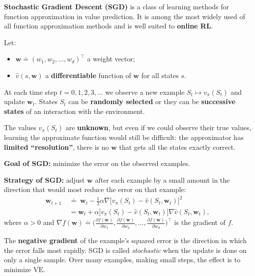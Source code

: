 \documentclass[11pt,a4paper]{article}
\theoremstyle{definition}
\theoremstyle{plain}
\theoremstyle{remark}
\begin{document}
\textbf{Stochastic Gradient Descent (SGD)} is a class of learning methods for function approximation in value prediction. It is among the most widely used of all function approximation methods and is well suited to \textbf{online RL}.

Let:
\begin{itemize}
    \item $\mathbf{w} \doteq (w_1, w_2, \ldots, w_d)^\top$ a weight vector;
    \item $\hat{v}(s, \mathbf{w})$ a \textbf{differentiable} function of $\mathbf{w}$ for all states $s$.
\end{itemize}
At each time step $t = 0, 1, 2, 3, \ldots$ we observe a new example $S_t \mapsto v_\pi(S_t)$ and update $\mathbf{w}_t$. States $S_t$ can be \textbf{randomly selected} or they can be \textbf{successive states} of an interaction with the environment.

The values $v_\pi(S_t)$ are \textbf{unknown}, but even if we could observe their true values, learning the approximate function would still be difficult: the approximator has \textbf{limited ``resolution''}, there is no $\mathbf{w}$ that gets all the states exactly correct.

\begin{tcolorbox}[colback=green!5!white, colframe=green!60!black, title={Goal and Strategy of SGD}]
\textbf{Goal of SGD:} minimize the error on the observed examples.

\textbf{Strategy of SGD:} adjust $\mathbf{w}$ after each example by a small amount in the direction that would most reduce the error on that example:
\begin{align*}
    \mathbf{w}_{t+1} \;&\doteq\; \mathbf{w}_t - \tfrac{1}{2}\alpha \nabla\!\bigl[v_\pi(S_t) - \hat{v}(S_t, \mathbf{w}_t)\bigr]^2 \\
                       &= \mathbf{w}_t + \alpha \bigl[v_\pi(S_t) - \hat{v}(S_t, \mathbf{w}_t)\bigr] \nabla \hat{v}(S_t, \mathbf{w}_t),
\end{align*}
where $\alpha > 0$ and $\nabla f(\mathbf{w}) \doteq \bigl(\tfrac{\partial f(\mathbf{w})}{\partial w_1}, \tfrac{\partial f(\mathbf{w})}{\partial w_2}, \ldots, \tfrac{\partial f(\mathbf{w})}{\partial w_d}\bigr)^\top$ is the gradient of $f$.
\end{tcolorbox}

The \textbf{negative gradient} of the example's squared error is the direction in which the error falls most rapidly. SGD is called \emph{stochastic} when the update is done on only a single sample. Over many examples, making small steps, the effect is to minimize $\overline{\mathrm{VE}}$.
\end{document}
